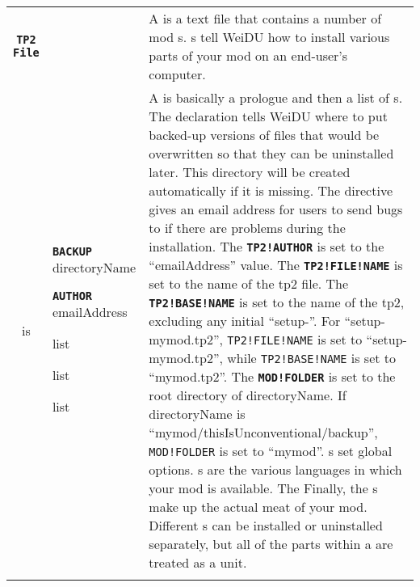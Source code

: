 \documentclass{article}
\def\ttref#1{\ahrefloc{#1}{\tt #1}}
\def\DEFINE#1{{\tt \bf #1}\label{#1}\index{#1}}
\def\t#1{{\tt #1}}
\def\Slist{{\color{red} list }}
\begin{document}
\begin{tabular}{cp{10in}|p{10in}}

\DEFINE{TP2 File} & &
  A \ttref{TP2 File} is a text file that contains a number of
  mod \ttref{Component}s. \ttref{TP2 File}s tell WeiDU how to install
  various parts of your mod on an end-user's computer. \\

  is & \DEFINE{BACKUP} directoryName

       \DEFINE{AUTHOR} emailAddress

       \ttref{TP2 Flag} \Slist

       \ttref{Language} \Slist

       \ttref{Component} \Slist &

       A \ttref{TP2 File} is basically a prologue and then a list of
       \ttref{Component}s. The \ttref{BACKUP} declaration tells WeiDU where
       to put backed-up versions of files that would be overwritten so that
       they can be uninstalled later. This directory will be created
       automatically if it is missing. The \ttref{AUTHOR} directive gives an
       email address for users to send bugs to if there are problems during
       the installation. The \DEFINE{TP2!AUTHOR} \ttref{variable} is set to
       the ``emailAddress'' value. The \DEFINE{TP2!FILE!NAME} \ttref{variable}
       is set to the name of the tp2 file. The \DEFINE{TP2!BASE!NAME}
       \ttref{variable} is set to the name of the tp2, excluding any initial
       ``setup-''. For ``setup-mymod.tp2'', \t{TP2!FILE!NAME} is set to
       ``setup-mymod.tp2'', while \t{TP2!BASE!NAME} is set to ``mymod.tp2''.
       The \DEFINE{MOD!FOLDER} \ttref{variable} is set to the root directory
       of directoryName. If directoryName is
       ``mymod/thisIsUnconventional/backup'', \t{MOD!FOLDER} is set to
       ``mymod''.
       \ttref{TP2 Flag}s set global options.
       \ttref{Language}s are
       the various languages in which your mod is available. The
       Finally, the \ttref{Component}s make up the actual meat of
       your mod. Different \ttref{Component}s can be installed or
       uninstalled separately, but all of the parts within a
       \ttref{Component} are treated as a unit.  \\
\\


\end{tabular}
\end{document}
